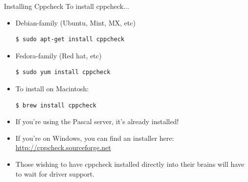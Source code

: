 \documentclass[11pt]{beamer}
\begin{document}
\begin{frame}[fragile=singleslide]{Installing Cppcheck}
To install cppcheck...
\begin{itemize}
\item Debian-family (Ubuntu, Mint, MX, etc)
\begin{lstlisting}[style=terminal]
$ sudo apt-get install cppcheck
\end{lstlisting}
\item Fedora-family (Red hat, etc)
\begin{lstlisting}[style=terminal]
$ sudo yum install cppcheck
\end{lstlisting}
\item To install on Macintosh:
\begin{lstlisting}[style=terminal]
$ brew install cppcheck
\end{lstlisting}
\item If you're using the Pascal server, it's already installed!
\item If you're on Windows, you can find an installer here: \url{http://cppcheck.sourceforge.net} \\ 
\item Those wishing to have cppcheck installed directly into their brains will have to wait for driver support.  
\end{itemize}
\end{frame}
\end{document}
